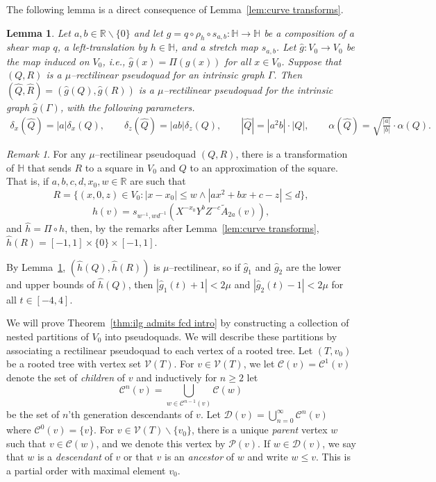 \documentclass[11pt,reqno]{amsart}
\renewcommand{\H}{\mathbb{H}}
\newcommand{\R}{\mathbb{R}}
\newcommand{\cC}{\mathcal{C}}
\newcommand{\cD}{\mathcal{D}}
\newcommand{\cP}{\mathcal{P}}
\newcommand{\cV}{\mathcal{V}}
\newcommand{\0}{\mathbf{0}}
\renewcommand{\1}{\mathbf 1}
\newcommand{\from}{\colon}
\renewcommand{\mid}{:}
\renewcommand{\ge}{\geqslant}
\renewcommand{\le}{\leqslant}
\renewcommand{\setminus}{\smallsetminus}
\newtheorem{lemma}[thm]{Lemma}
\theoremstyle{remark}
\newtheorem{remark}[thm]{Remark}
\begin{document}
The following lemma is a direct consequence of Lemma~\ref{lem:curve transforms}.
\begin{lemma}\label{lem:quad transforms}
  Let $a,b\in \R\setminus \{0\}$ and let $g=q\circ \rho_h\circ s_{a,b}\from \H\to \H$  be a composition of a shear map $q$, a left-translation by $h\in \H$, and a stretch map $s_{a,b}$.  Let $\hat{g}\from V_0\to V_0$ be the map induced on $V_0$, i.e., $\hat{g}(x)=\Pi(g(x))$ for all $x\in V_0$. Suppose that $(Q,R)$ is a $\mu$--rectilinear pseudoquad for an intrinsic graph $\Gamma$.  Then $(\hat{Q},\hat{R})=(\hat{g}(Q),\hat{g}(R))$ is a $\mu$--rectilinear pseudoquad for the intrinsic graph $\hat{g}(\Gamma)$, with the following parameters.
  \begin{align*}
    \delta_x(\hat{Q})=|a|\delta_x(Q),\qquad \delta_z(\hat{Q})=|ab| \delta_z(Q),\qquad
    |\hat{Q}|=|a^2b|\cdot |Q|,\qquad  \alpha(\hat{Q})  = \sqrt{\frac{|a|}{|b|}}\cdot  \alpha(Q).
  \end{align*}
\end{lemma}

\begin{remark}\label{rem:normalizing rectilinear}
  For any $\mu$--rectilinear pseudoquad $(Q,R)$, there is a transformation of $\H$ that sends $R$ to a square in $V_0$ and $Q$ to an approximation of the square. That is, if $a,b,c,d,x_0,w\in \R$ are such that
  $$R=\{(x,0,z)\in V_0 \mid |x-x_0|\le w \wedge |ax^2+bx+c -z| \le d\},$$
  $$h(v)=s_{w^{-1},wd^{-1}}\left(X^{-x_0} Y^{b}Z^{-c}  \tilde{A}_{2a}(v)\right),$$
  and $\hat{h} =\Pi \circ h$,
  then, by the remarks after Lemma~\ref{lem:curve transforms}, $\hat{h}(R)=[-1,1]\times \{0\}\times [-1,1].$

  By Lemma~\ref{lem:quad transforms}, $(\hat{h}(Q),\hat{h}(R))$ is $\mu$--rectilinear, so if $\hat{g}_1$ and $\hat{g}_2$ are the lower and upper bounds of $\hat{h}(Q)$, then $|\hat{g}_1(t)+1|<2\mu$ and $|\hat{g}_2(t)-1|<2\mu$ for all $t\in [-4,4].$
\end{remark}

We will prove Theorem~\ref{thm:ilg admits fcd intro} by constructing a collection of nested partitions of $V_0$ into pseudoquads.  We will describe these partitions by associating a rectilinear pseudoquad to each vertex of a rooted tree.  Let $(T,v_0)$ be a rooted tree with vertex set $\cV(T)$.  For $v\in \cV(T)$, we let $\cC(v)=\cC^1(v)$ denote the set of \emph{children} of $v$ and inductively for $n\ge 2$ let
$$\cC^n(v)=\bigcup_{w\in \cC^{n-1}(v)} \cC(w)$$
be the set of $n$'th generation descendants of $v$. Let $\cD(v)=\bigcup_{n=0}^\infty \cC^n(v)$ where $\cC^0(v)=\{v\}$.  For  $v\in \cV(T)\setminus \{v_0\}$, there is a unique \emph{parent} vertex $w$ such that $v\in \cC(w)$, and we denote this vertex by $\cP(v)$.  If $w\in \cD(v)$, we say that $w$ is a \emph{descendant} of $v$ or that $v$ is an \emph{ancestor} of $w$ and write $w\le v$.  This is a partial order with maximal element $v_0$.
\end{document}
